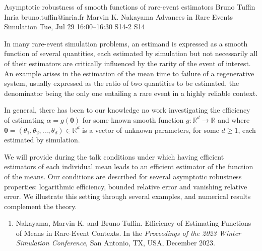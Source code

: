 \documentclass[12pt,lettersize,oneside]{book} %
\begin{document}
\begin{talk}
  {Asymptotic robustness of  smooth functions of  rare-event estimators}%
  {Bruno Tuffin}%
  {Inria}%
  {bruno.tuffin@inria.fr}%
  {Marvin K. Nakayama}%
  {Advances in Rare Events Simulation}%
  {Tue, Jul 29 16:00--16:30}%
  {S14-2}%
  {S14}%
    
   
In many rare-event simulation problems, an estimand is expressed  as a smooth function of several quantities,  each
estimated by simulation  but not necessarily all of their estimators are critically influenced by
the rarity of the event of interest.  
An example arises in the estimation of the mean time to failure of a regenerative system, usually expressed as the ratio of two quantities to be estimated, the denominator being the only one  entailing a rare event in a highly reliable context.

In general, there has been to our knowledge no work investigating  the efficiency  of estimating $\alpha = g({\boldsymbol{\theta}})$
for some known  smooth function $g : \mathbb{R}^d \to \mathbb{R}$ and where ${\boldsymbol{\theta}} = (\theta_1, \theta_2, \ldots, \theta_d) \in \mathbb{R}^d$ is a vector of unknown parameters, for some $d \geq 1$, each  estimated by simulation.

We will provide during the talk conditions under which having efficient estimators of each individual mean leads to an efficient estimator of the function of the means. Our conditions are described for several asymptotic robustness properties: logarithmic efficiency, bounded relative error and vanishing relative error.
We illustrate this setting through several examples, and numerical results complement the theory.


   

\medskip


\begin{enumerate}
 \item[{[1]}]  Nakayama, Marvin K. and Bruno Tuffin.  Efficiency of Estimating Functions of Means in Rare-Event Contexts. In the {\it Proceedings of the 2023 Winter Simulation Conference}, San Antonio, TX, USA, December 2023.
\end{enumerate}

\end{talk}
\end{document}
